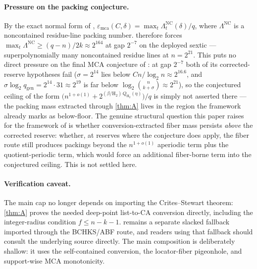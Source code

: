 \documentclass[11pt]{article}
\theoremstyle{definition}
\theoremstyle{remark}
\newcommand{\emca}{\varepsilon_{\mathrm{mca}}}
\newcommand{\Hb}{\mathrm{H}_2}
\begin{document}
\paragraph{Pressure on the packing conjecture.}
By the exact normal form of \cite{Cho26b}, $\emca(C,\delta)=\max_t\Lambda^{\mathrm{NC}}_t(\delta)/q$, where $\Lambda^{\mathrm{NC}}$ is a noncontained residue-line packing number.  therefore forces $\max_t\Lambda^{\mathrm{NC}}\ge(q-n)/2k\approx2^{164}$ at gap $2^{-7}$ on the deployed sextic --- superpolynomially many noncontained residue lines at $n=2^{21}$. This puts no direct pressure on the final MCA conjecture of \cite[Conj.\ ``Final floor- and quotient-corrected MCA asymptotic'']{Cho26b}: at gap $2^{-7}$ both of its corrected-reserve hypotheses fail ($\sigma=2^{14}$ lies below $Cn/\log_2n\approx2^{16.6}$, and $\sigma\log_2 q_{\mathrm{gen}}=2^{14}\cdot31\approx2^{19}$ is far below $\log_2\binom n{k+\sigma}\approx2^{21}$), so the conjectured ceiling of the form $\bigl(n^{1+o(1)}+2^{(\beta/\Hb)\,Q_{\Hb}(\eta)}\bigr)/q$ is simply not asserted there --- the packing mass extracted through \cref{thm:A} lives in the region the framework already marks as below-floor. The genuine structural question this paper raises for the framework of \cite{Cho26b} is whether conversion-extracted fiber mass persists \emph{above} the corrected reserve: whether, at reserves where the conjecture does apply, the fiber route still produces packings beyond the $n^{1+o(1)}$ aperiodic term plus the quotient-periodic term, which would force an additional fiber-borne term into the conjectured ceiling. This is not settled here.

\paragraph{Verification caveat.}
The main cap no longer depends on importing the Crites--Stewart theorem: \cref{thm:A} proves the needed deep-point list-to-CA conversion directly, including the integer-radius condition $f\le n-k-1$.   remains a separate slacked fallback imported through the BCHKS/ABF route, and readers using that fallback should consult the underlying source directly.  The main composition is deliberately shallow: it uses the self-contained conversion, the locator-fiber pigeonhole, and support-wise MCA monotonicity.
\end{document}
